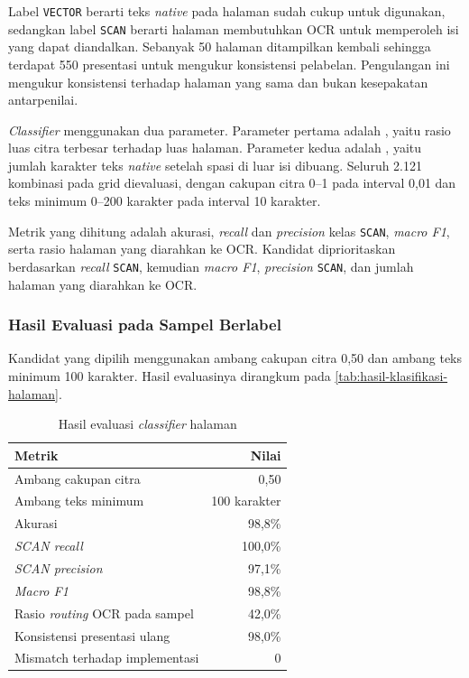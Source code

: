 Label \texttt{VECTOR} berarti teks \textit{native} pada halaman sudah cukup untuk digunakan, sedangkan label \texttt{SCAN} berarti halaman membutuhkan OCR untuk memperoleh isi yang dapat diandalkan.
Sebanyak 50 halaman ditampilkan kembali sehingga terdapat 550 presentasi untuk mengukur konsistensi pelabelan.
Pengulangan ini mengukur konsistensi terhadap halaman yang sama dan bukan kesepakatan antarpenilai.

\textit{Classifier} menggunakan dua parameter.
Parameter pertama adalah , yaitu rasio luas citra terbesar terhadap luas halaman.
Parameter kedua adalah , yaitu jumlah karakter teks \textit{native} setelah spasi di luar isi dibuang.
Seluruh 2.121 kombinasi pada grid dievaluasi, dengan cakupan citra 0--1 pada interval 0,01 dan teks minimum 0--200 karakter pada interval 10 karakter.

Metrik yang dihitung adalah akurasi, \textit{recall} dan \textit{precision} kelas \texttt{SCAN}, \textit{macro F1}, serta rasio halaman yang diarahkan ke OCR.
Kandidat diprioritaskan berdasarkan \textit{recall} \texttt{SCAN}, kemudian \textit{macro F1}, \textit{precision} \texttt{SCAN}, dan jumlah halaman yang diarahkan ke OCR.

\subsubsection{Hasil Evaluasi pada Sampel Berlabel}
\label{sec:hasil-klasifikasi-halaman}

Kandidat yang dipilih menggunakan ambang cakupan citra 0,50 dan ambang teks minimum 100 karakter.
Hasil evaluasinya dirangkum pada \autoref{tab:hasil-klasifikasi-halaman}.

\begin{table}[htb]
  \centering
  \footnotesize
  \caption{Hasil evaluasi \textit{classifier} halaman}
  \label{tab:hasil-klasifikasi-halaman}
  \begin{tabular}{@{}lr@{}}
    \toprule
    \textbf{Metrik} & \textbf{Nilai} \\
    \midrule
    Ambang cakupan citra & 0,50 \\
    Ambang teks minimum & 100 karakter \\
    Akurasi & 98,8\% \\
    \textit{SCAN recall} & 100,0\% \\
    \textit{SCAN precision} & 97,1\% \\
    \textit{Macro F1} & 98,8\% \\
    Rasio \textit{routing} OCR pada sampel & 42,0\% \\
    Konsistensi presentasi ulang & 98,0\% \\
    Mismatch terhadap implementasi & 0 \\
    \bottomrule
  \end{tabular}
\end{table}

